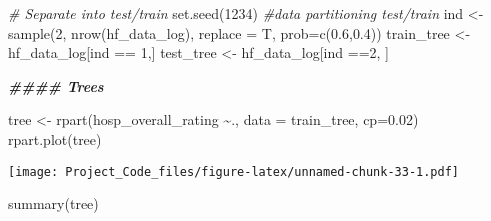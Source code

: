 \documentclass[
]{article}
\newenvironment{Shaded}{\begin{snugshade}}{\end{snugshade}}
\newcommand{\AttributeTok}[1]{\textcolor[rgb]{0.77,0.63,0.00}{#1}}
\newcommand{\CommentTok}[1]{\textcolor[rgb]{0.56,0.35,0.01}{\textit{#1}}}
\newcommand{\DecValTok}[1]{\textcolor[rgb]{0.00,0.00,0.81}{#1}}
\newcommand{\DocumentationTok}[1]{\textcolor[rgb]{0.56,0.35,0.01}{\textbf{\textit{#1}}}}
\newcommand{\FloatTok}[1]{\textcolor[rgb]{0.00,0.00,0.81}{#1}}
\newcommand{\FunctionTok}[1]{\textcolor[rgb]{0.00,0.00,0.00}{#1}}
\newcommand{\NormalTok}[1]{#1}
\newcommand{\OtherTok}[1]{\textcolor[rgb]{0.56,0.35,0.01}{#1}}
\newcommand{\SpecialCharTok}[1]{\textcolor[rgb]{0.00,0.00,0.00}{#1}}
\begin{document}
\begin{Shaded}
\begin{Highlighting}[]
  \CommentTok{\# Separate into test/train  }
  \FunctionTok{set.seed}\NormalTok{(}\DecValTok{1234}\NormalTok{)}
  \CommentTok{\#data partitioning test/train}
\NormalTok{  ind }\OtherTok{\textless{}{-}} \FunctionTok{sample}\NormalTok{(}\DecValTok{2}\NormalTok{, }\FunctionTok{nrow}\NormalTok{(hf\_data\_log), }\AttributeTok{replace =}\NormalTok{ T, }\AttributeTok{prob=}\FunctionTok{c}\NormalTok{(}\FloatTok{0.6}\NormalTok{,}\FloatTok{0.4}\NormalTok{))}
\NormalTok{  train\_tree }\OtherTok{\textless{}{-}}\NormalTok{ hf\_data\_log[ind }\SpecialCharTok{==} \DecValTok{1}\NormalTok{,]}
\NormalTok{  test\_tree }\OtherTok{\textless{}{-}}\NormalTok{ hf\_data\_log[ind }\SpecialCharTok{==}\DecValTok{2}\NormalTok{, ]}
\end{Highlighting}
\end{Shaded}

\begin{Shaded}
\begin{Highlighting}[]
\DocumentationTok{\#\#\#\# Trees}

\NormalTok{tree }\OtherTok{\textless{}{-}} \FunctionTok{rpart}\NormalTok{(hosp\_overall\_rating }\SpecialCharTok{\textasciitilde{}}\NormalTok{., }\AttributeTok{data =}\NormalTok{ train\_tree, }\AttributeTok{cp=}\FloatTok{0.02}\NormalTok{)}
\FunctionTok{rpart.plot}\NormalTok{(tree)}
\end{Highlighting}
\end{Shaded}

\texttt{[image: Project\_Code\_files/figure-latex/unnamed-chunk-33-1.pdf]}

\begin{Shaded}
\begin{Highlighting}[]
\FunctionTok{summary}\NormalTok{(tree)}
\end{Highlighting}
\end{Shaded}
\end{document}
